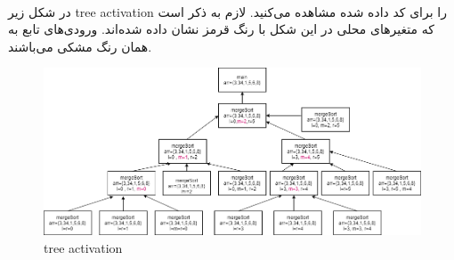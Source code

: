 
\\
در شکل زیر
tree activation
را برای کد داده شده مشاهده می‌کنید.
لازم به ذکر است که متغیرهای محلی
در این شکل با رنگ قرمز نشان داده شده‌اند.
ورودی‌های تابع به همان رنگ مشکی می‌باشند.
\begin{figure}[htp]
    \centering
    \includegraphics[width=18cm]{images/q1.png}
    \caption{tree activation }
\end{figure}